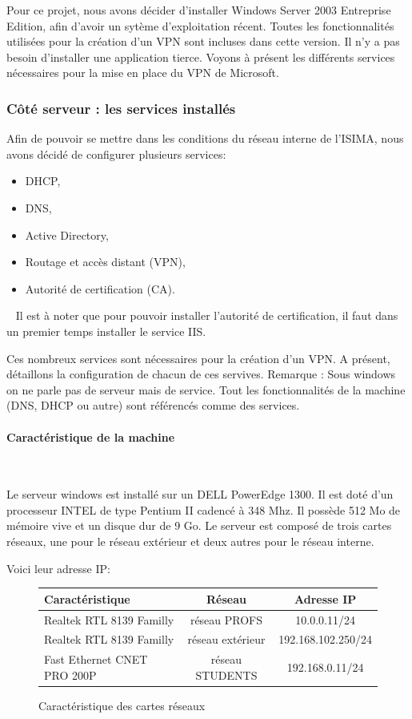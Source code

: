 	Pour ce projet, nous avons décider d'installer Windows Server 2003 Entreprise Edition, afin d'avoir un sytème d'exploitation récent. Toutes les fonctionnalités utilisées pour la création d'un VPN sont incluses dans cette version. Il n'y a pas besoin d'installer une application tierce.
	Voyons à présent les différents services nécessaires pour la mise en place du VPN de Microsoft.

\subsubsection{Côté serveur : les services installés}

	Afin de pouvoir se mettre dans les conditions du réseau interne de l'ISIMA, nous avons décidé de configurer plusieurs services:
~


\begin{itemize}
	\item  DHCP,
	\item  DNS, 
	\item  Active Directory,
	\item  Routage et accès distant (VPN),
	\item  Autorité de certification (CA).
\end{itemize}
~
Il est à noter que pour pouvoir installer l'autorité de certification, il faut dans un premier temps installer le service IIS.	

	Ces nombreux services sont nécessaires pour la création d'un VPN. A présent, détaillons la configuration de chacun de ces servives. 
	Remarque : Sous windows on ne parle pas de serveur mais de service. Tout les fonctionnalités de la machine (DNS, DHCP ou autre) sont référencés comme des services.


\paragraph{Caractéristique de la machine}
~\

Le serveur windows est installé sur un DELL PowerEdge 1300. Il est doté d'un processeur INTEL de type Pentium II cadencé à 348 Mhz. Il possède 512 Mo de mémoire vive et un disque dur de 9 Go.
Le serveur est composé de trois cartes réseaux, une pour le réseau extérieur et deux autres pour le réseau interne. 



Voici leur adresse IP:

\begin{figure}[H]
	\begin{center}
\begin{tabular}{|l|c|c|}
\hline
Caractéristique & Réseau & Adresse IP \\
\hline
Realtek RTL 8139 Familly & réseau PROFS & 10.0.0.11/24 \\
Realtek RTL 8139 Familly & réseau extérieur & 192.168.102.250/24 \\
Fast Ethernet CNET PRO 200P & réseau STUDENTS & 192.168.0.11/24 \\
\hline
\end{tabular}
	\end{center}
	\caption{Caractéristique des cartes réseaux}
	\label{IP_carte_reseau}
\end{figure}

